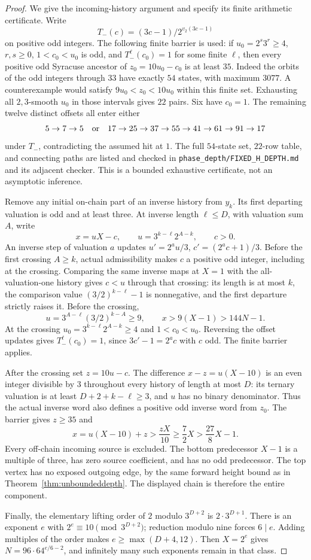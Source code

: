 \documentclass[11pt]{article}
\begin{document}
\begin{proof}
We give the incoming-history argument and specify its finite arithmetic
certificate. Write
\[
T_-(c)=(3c-1)/2^{v_2(3c-1)}
\]
on positive odd integers. The following finite barrier is used:
if $u_0=2^s3^r\ge4$, $r,s\ge0$, $1<c_0<u_0$ is odd, and
$T_-^\ell(c_0)=1$ for some finite $\ell$, then every positive odd
Syracuse ancestor of $z_0=10u_0-c_0$ is at least $35$.
Indeed the orbits of the odd integers through $33$ have exactly $54$
states, with maximum $3077$. A counterexample would satisfy
$9u_0<z_0<10u_0$ within this finite set. Exhausting all $2,3$-smooth
$u_0$ in those intervals gives $22$ pairs. Six have $c_0=1$.
The remaining twelve distinct offsets all enter either
\[
5\to7\to5
\quad\hbox{or}\quad
17\to25\to37\to55\to41\to61\to91\to17
\]
under $T_-$, contradicting the assumed hit at $1$.
The full $54$-state set, $22$-row table, and connecting paths are
listed and checked in
\texttt{phase\_depth/FIXED\_H\_DEPTH.md} and its adjacent checker.
This is a bounded exhaustive certificate, not an asymptotic inference.

Remove any initial on-chain part of an inverse history from $y_k$.
Its first departing valuation is odd and at least three.
At inverse length $\ell\le D$, with valuation sum $A$, write
\[
x=uX-c,\qquad u=3^{k-\ell}2^{A-k},\qquad c>0.
\]
An inverse step of valuation $a$ updates
$u'=2^a u/3$, $c'=(2^ac+1)/3$.
Before the first crossing $A\ge k$, actual admissibility makes $c$
a positive odd integer, including at the crossing. Comparing the
same inverse maps at $X=1$ with the all-valuation-one history gives
$c<u$ through that crossing: its length is at most $k$, the comparison
value $(3/2)^{k-\ell}-1$ is nonnegative, and the first departure
strictly raises it. Before the crossing,
\[
u=3^{A-\ell}(3/2)^{k-A}\ge9,\qquad x>9(X-1)>144N-1.
\]
At the crossing $u_0=3^{k-\ell}2^{A-k}\ge4$ and
$1<c_0<u_0$. Reversing the offset updates gives
$T_-^\ell(c_0)=1$, since $3c'-1=2^ac$ with $c$ odd.
The finite barrier applies.

After the crossing set $z=10u-c$. The difference
$x-z=u(X-10)$ is an even integer divisible by $3$ throughout every
history of length at most $D$: its ternary valuation is at least
$D+2+k-\ell\ge3$, and $u$ has no binary denominator.
Thus the actual inverse word also defines a positive odd inverse
word from $z_0$. The barrier gives $z\ge35$ and
\[
x=u(X-10)+z>\frac{zX}{10}\ge\frac72X>\frac{27}{8}X-1.
\]
Every off-chain incoming source is excluded. The bottom predecessor
$X-1$ is a multiple of three, has zero source coefficient, and has
no odd predecessor. The top vertex has no exposed outgoing edge,
by the same forward height bound as in
Theorem~\ref{thm:unboundeddepth}. The displayed chain is therefore
the entire component.

Finally, the elementary lifting order of $2$ modulo $3^{D+2}$ is
$2\cdot3^{D+1}$. There is an exponent $e$ with
$2^e\equiv10\pmod{3^{D+2}}$; reduction modulo nine forces $6\mid e$.
Adding multiples of the order makes $e\ge\max(D+4,12)$.
Then $X=2^e$ gives $N=96\cdot64^{e/6-2}$, and infinitely many
such exponents remain in that class.
\end{proof}
\end{document}
